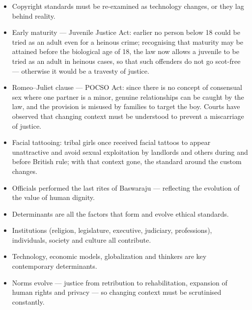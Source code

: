 \begin{ExampleBox}
\begin{itemize}
\item Copyright standards must be re-examined as technology changes, or they lag behind reality.
\item Early maturity --- Juvenile Justice Act: earlier no person below 18 could be tried as an adult even for a heinous crime; recognising that maturity may be attained before the biological age of 18, the law now allows a juvenile to be tried as an adult in heinous cases, so that such offenders do not go scot-free --- otherwise it would be a travesty of justice.
\item Romeo--Juliet clause --- POCSO Act: since there is no concept of consensual sex where one partner is a minor, genuine relationships can be caught by the law, and the provision is misused by families to target the boy. Courts have observed that changing context must be understood to prevent a miscarriage of justice.
\item Facial tattooing: tribal girls once received facial tattoos to appear unattractive and avoid sexual exploitation by landlords and others during and before British rule; with that context gone, the standard around the custom changes.
\item Officials performed the last rites of Baswaraju --- reflecting the evolution of the value of human dignity.
\end{itemize}
\end{ExampleBox}

\begin{QuickRevision}
\begin{itemize}
\item Determinants are all the factors that form and evolve ethical standards.
\item Institutions (religion, legislature, executive, judiciary, professions), individuals, society and culture all contribute.
\item Technology, economic models, globalization and thinkers are key contemporary determinants.
\item Norms evolve --- justice from retribution to rehabilitation, expansion of human rights and privacy --- so changing context must be scrutinised constantly.
\end{itemize}
\end{QuickRevision}
